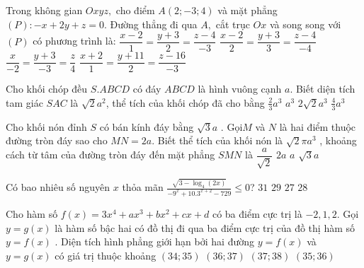 \begin{ex} %
Trong không gian $Oxyz,$ cho điểm $A( 2;-3;4 )$ và mặt phẳng $( P ):-x+2y+z=0$. Đường thẳng đi qua $A,$ cắt trục $Ox$ và song song với $( P )$ có phương trình là:
\choice 
{ $\dfrac{x-2}{1}=\dfrac{y+3}{2}=\dfrac{z-4}{-3}$}
{ \True $\dfrac{x-2}{2}=\dfrac{y+3}{3}=\dfrac{z-4}{-4}$} 
{ $\dfrac{x}{-2}=\dfrac{y+3}{-3}=\dfrac{z}{4}$}
{ $\dfrac{x+2}{1}=\dfrac{y+11}{2}=\dfrac{z-16}{-3}$} \end{ex} 
\begin{ex} %
Cho khối chóp đều $S.ABCD$ có đáy $ABCD$ là hình vuông cạnh $a$. Biết diện tích tam giác $SAC$ là $\sqrt{2}a^2$, thể tích của khối chóp đã cho bằng
\choice 
{ \True $\frac{2}{3} a^{3}$ }
{ $a^{3}$ }
{ $2 \sqrt{2} a^{3}$ }
{ $\frac{4}{3} a^{3}$ } \end{ex} 
\begin{ex} %
Cho khối nón đỉnh $S$ có bán kính đáy bằng $\sqrt{3}a $ . Gọi$M$ và $N$ là hai điểm thuộc đường tròn đáy sao cho $MN=2a$. Biết thể tích của khối nón là $\sqrt{2}\pi a^3$ , khoảng cách từ tâm của đường tròn đáy đến mặt phẳng $SMN$  là
\choice 
{ $\dfrac{a}{\sqrt{2}}$ }
{ $2a$ }
{ \True $a$ }
{ $\sqrt{3}a$ } \end{ex} 
\begin{ex} %
Có bao nhiêu số nguyên $x$  thỏa mãn $\frac{\sqrt{3-{{\log }_{4}}\left( 2x \right)}}{-{{9}^{x}}+{{10.3}^{x+2}}-729}\le 0$?
\choice 
{ $31$ }
{ \True $29$ }
{ $27$ }
{$28$  }
 \end{ex} 
\begin{ex} %
Cho hàm số $f(x)=3x^4+ax^3+bx^2+cx+d$  có ba điểm cực trị là $-2,1,2$. Gọi $y=g(x)$  là hàm số bậc hai có đồ thị đi qua ba điểm cực trị của đồ thị hàm số $y=f(x)$ . Diện tích hình phẳng giới hạn bởi hai đường $y=f(x)$  và $y=g(x)$  có giá trị thuộc khoảng
\choice 
{ $(34;35 )$ }
{ $(36;37 )$ }
{ \True $(37;38 )$ }
{ $(35;36 )$ } \end{ex} 
